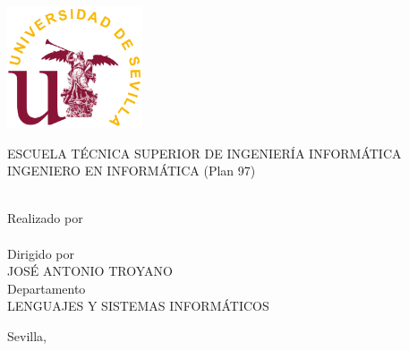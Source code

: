 
\thispagestyle{empty}

\begingroup

\begin{center}
\includegraphics[width=4cm]{logo-us}\\[1.3cm]

\Large

\portadafont

ESCUELA TÉCNICA SUPERIOR DE INGENIERÍA INFORMÁTICA\\[0.8cm]

INGENIERO EN INFORMÁTICA (Plan 97)\\[2.8cm]

\MakeUppercase{\pfctitle}\\[2.7cm]

\large

Realizado por\\[0.1cm]

\MakeUppercase{\pfcauthor}\\[0.8cm]

Dirigido por\\[0.1cm]

JOSÉ ANTONIO TROYANO\\[0.8cm]

Departamento\\[0.1cm]

LENGUAJES Y SISTEMAS INFORMÁTICOS\\[3.6cm]


\end{center}

\begin{flushright}
\portadafont
Sevilla, \pfcdate
\end{flushright}

\endgroup
